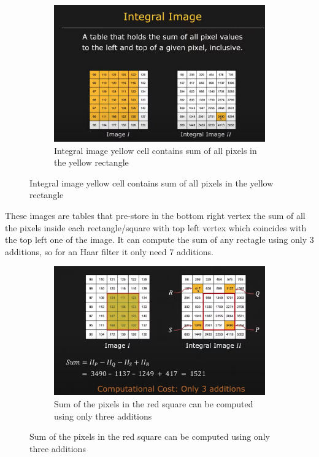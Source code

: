 \documentclass[12pt,a4paper]{article}
\begin{document}
\begin{large}
\begin{figure} [!h]
\begin{subfigure}[b]{0.4\textwidth}
    \end{subfigure}
    \hspace{0.1cm}
    \begin{subfigure}[b]{0.4\textwidth}
      \centering
      \captionsetup{justification=centering}
        \includegraphics[width=\textwidth]{images/haar7.png}
        \caption{Integral image yellow cell contains sum of all pixels in the yellow rectangle}

      \end{subfigure}
  \end{figure}
These images are tables that pre-store in the bottom right vertex the sum of all the pixels inside each rectangle/square with top left vertex which coincides with the top left one of the image. It can compute the sum of any rectagle using only 3 additions, so for an Haar filter it only need 7 additions.
\begin{figure} [!hbp]
  \centering
    \begin{subfigure}[b]{0.4\textwidth}
    \centering
    \captionsetup{justification=centering}
      \includegraphics[width=\textwidth]{images/haar8.png}
      \caption{Sum of the pixels in the red square can be computed using only three additions}
      

\end{subfigure}
\end{figure}
\end{large}
\end{document}
